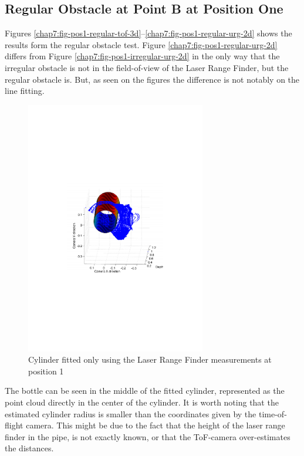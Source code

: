 \subsection{Regular Obstacle at Point B at Position One}
Figures \ref{chap7:fig-pos1-regular-tof-3d}--\ref{chap7:fig-pos1-regular-urg-2d} shows the
results form the regular obstacle test. Figure \ref{chap7:fig-pos1-regular-urg-2d} differs
from Figure \ref{chap7:fig-pos1-irregular-urg-2d} in the only way that the irregular
obstacle is not in the field-of-view of the Laser Range Finder, but the regular obstacle
is. But, as seen on the figures the difference is not notably on the line fitting.
\begin{figure}[htbp]
    \centering
    \includegraphics[width=0.7\textwidth]{pics/pos1-regular-urg-3d}
    \caption{Cylinder fitted only using the Laser Range Finder measurements at position 1}
    \label{chap7:fig-pos1-regular-urg-3d}
\end{figure}
The bottle can be seen in the middle of the fitted cylinder, represented as the point
cloud directly in the center of the cylinder. It is worth noting that the estimated
cylinder radius is smaller than the coordinates given by the time-of-flight camera. This
might be due to the fact that the height of the laser range finder in the pipe, is not
exactly known, or that the ToF-camera over-estimates the distances. 

